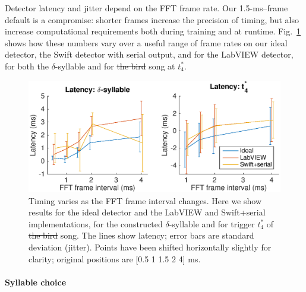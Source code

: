 \documentclass[10pt,letterpaper]{article}
\newcommand\fig[1]{Fig.~\ref{#1}}
\renewcommand{\subsubsection}[1]{\paragraph{#1}}
\providecommand{\DIFaddtex}[1]{{\protect\color{blue}\uwave{#1}}} %
\providecommand{\DIFdeltex}[1]{{\protect\color{red}\sout{#1}}}                      %
\providecommand{\DIFaddbegin}{} %
\providecommand{\DIFaddend}{} %
\providecommand{\DIFdelbegin}{} %
\providecommand{\DIFdelend}{} %
\providecommand{\DIFaddFL}[1]{\DIFadd{#1}} %
\providecommand{\DIFdelFL}[1]{\DIFdel{#1}} %
\providecommand{\DIFaddbeginFL}{} %
\providecommand{\DIFaddendFL}{} %
\providecommand{\DIFdelbeginFL}{} %
\providecommand{\DIFdelendFL}{} %
\providecommand{\DIFadd}[1]{\texorpdfstring{\DIFaddtex{#1}}{#1}} %
\providecommand{\DIFdel}[1]{\texorpdfstring{\DIFdeltex{#1}}{}} %
\newcommand{\DIFscaledelfig}{0.5}
\newlength{\DIFdelgraphicswidth} %
\newlength{\DIFdelgraphicsheight} %
\newcommand{\DIFaddincludegraphics}[2][]{{\color{blue}\fbox{\DIFOincludegraphics[#1]{#2}}}} %
\newcommand{\DIFdelincludegraphics}[2][]{%
\sbox{\DIFdelgraphicsbox}{\DIFOincludegraphics[#1]{#2}}%
\settoboxwidth{\DIFdelgraphicswidth}{\DIFdelgraphicsbox} %
\settoboxtotalheight{\DIFdelgraphicsheight}{\DIFdelgraphicsbox} %
\scalebox{\DIFscaledelfig}{%
\parbox[b]{\DIFdelgraphicswidth}{\usebox{\DIFdelgraphicsbox}\\[-\baselineskip] \rule{\DIFdelgraphicswidth}{0em}}\llap{\resizebox{\DIFdelgraphicswidth}{\DIFdelgraphicsheight}{%
\setlength{\unitlength}{\DIFdelgraphicswidth}%
\begin{picture}(1,1)%
\thicklines\linethickness{2pt} %
{\color[rgb]{1,0,0}\put(0,0){\framebox(1,1){}}}%
{\color[rgb]{1,0,0}\put(0,0){\line( 1,1){1}}}%
{\color[rgb]{1,0,0}\put(0,1){\line(1,-1){1}}}%
\end{picture}%
}\hspace*{3pt}}} %
} %
\DeclareRobustCommand{\DIFaddbegin}{\DIFOaddbegin \let\includegraphics\DIFaddincludegraphics} %
\DeclareRobustCommand{\DIFaddend}{\DIFOaddend \let\includegraphics\DIFOincludegraphics} %
\DeclareRobustCommand{\DIFdelbegin}{\DIFOdelbegin \let\includegraphics\DIFdelincludegraphics} %
\DeclareRobustCommand{\DIFdelend}{\DIFOaddend \let\includegraphics\DIFOincludegraphics} %
\DeclareRobustCommand{\DIFaddbeginFL}{\DIFOaddbeginFL \let\includegraphics\DIFaddincludegraphics} %
\DeclareRobustCommand{\DIFaddendFL}{\DIFOaddendFL \let\includegraphics\DIFOincludegraphics} %
\DeclareRobustCommand{\DIFdelbeginFL}{\DIFOdelbeginFL \let\includegraphics\DIFdelincludegraphics} %
\DeclareRobustCommand{\DIFdelendFL}{\DIFOaddendFL \let\includegraphics\DIFOincludegraphics} %
\begin{document}
Detector latency and jitter depend on the FFT frame rate.  Our
1.5-ms--frame default is a compromise: shorter frames increase the
precision of timing, but also increase computational requirements both
during training and at runtime.  \fig{fig:TimingVsFrame} shows how
these numbers vary over a useful range of frame rates on our ideal
detector, the Swift detector with serial output, and for the LabVIEW
detector, for both the $\delta$-syllable and for \DIFdelbegin \DIFdel{the bird }\DIFdelend \DIFaddbegin \DIFadd{lny64's }\DIFaddend song at
$t^*_4$.

\begin{figure}
  \includegraphics[width=\textwidth]{Fig4}
  \caption{Timing varies as the FFT frame interval changes.  Here we
    show results for the ideal detector and the LabVIEW and
    Swift+serial implementations, for the constructed
    $\delta$-syllable and for trigger $t^*_4$ of \DIFdelbeginFL \DIFdelFL{the bird }\DIFdelendFL \DIFaddbeginFL \DIFaddFL{lny64's }\DIFaddendFL song.  The
    lines show latency; error bars are standard deviation (jitter).  Points have
    been shifted horizontally slightly for clarity; original positions are [0.5 1
      1.5 2 4] ms.}
  \label{fig:TimingVsFrame}
\end{figure}

\subsubsection{Syllable choice}
\end{document}
